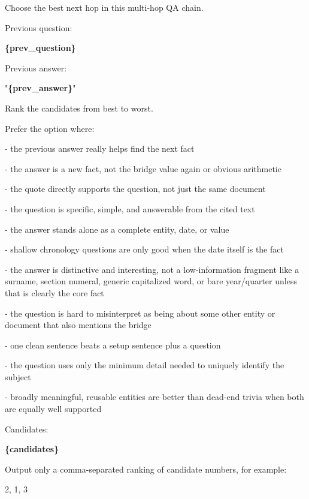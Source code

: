 \begin{tcolorbox}[colback=white, colframe=my-green, coltitle=black, parskip=5mm, title=\textbf{Candidate Hop Ranker}, halign=flush left, enhanced, breakable, skin first=enhanced, skin middle=enhanced, skin last=enhanced]
\begin{scriptsize}
\ttfamily
\setlength{\parindent}{0pt}
Choose the best next hop in this multi-hop QA chain.\par
\mbox{}\par
Previous question:\par
\textcolor{my-green}{\textbf{\{prev\_question\}}}\par
\mbox{}\par
Previous answer:\par
"\textcolor{my-green}{\textbf{\{prev\_answer\}}}"\par
\mbox{}\par
Rank the candidates from best to worst.\par
\mbox{}\par
Prefer the option where:\par
- the previous answer really helps find the next fact\par
- the answer is a new fact, not the bridge value again or obvious arithmetic\par
- the quote directly supports the question, not just the same document\par
- the question is specific, simple, and answerable from the cited text\par
- the answer stands alone as a complete entity, date, or value\par
- shallow chronology questions are only good when the date itself is the fact\par
- the answer is distinctive and interesting, not a low-information fragment like a surname, section numeral, generic capitalized word, or bare year/quarter unless that is clearly the core fact\par
- the question is hard to misinterpret as being about some other entity or document that also mentions the bridge\par
- one clean sentence beats a setup sentence plus a question\par
- the question uses only the minimum detail needed to uniquely identify the subject\par
- broadly meaningful, reusable entities are better than dead-end trivia when both are equally well supported\par
\mbox{}\par
Candidates:\par
\textcolor{my-green}{\textbf{\{candidates\}}}\par
\mbox{}\par
Output only a comma-separated ranking of candidate numbers, for example:\par
2, 1, 3\par
\end{scriptsize}
\end{tcolorbox}

